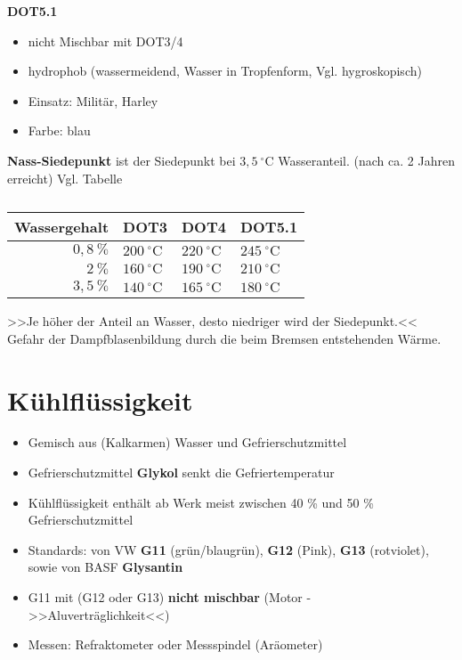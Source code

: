 \textbf{DOT5.1}

\begin{itemize}
\item
  nicht Mischbar mit DOT3/4
\item
  hydrophob (wassermeidend, Wasser in Tropfenform, Vgl. hygroskopisch)
\item
  Einsatz: Militär, Harley
\item
  Farbe: blau
\end{itemize}

\textbf{Nass-Siedepunkt} ist der Siedepunkt bei $3,5~^\circ\text{C}$
Wasseranteil. (nach ca. 2 Jahren erreicht) Vgl. Tabelle

\begin{table}[!ht]%
\centering 
	\caption{}%
\begin{tabular}{@{}rlll@{}}
\hline
\textbf{Wassergehalt} & \textbf{DOT3} & \textbf{DOT4} &
\textbf{DOT5.1} \\
\hline
$0,8~\%$ & $200~^\circ\text{C}$ & $220~^\circ\text{C}$ &
$245~^\circ\text{C}$ \\
$2~\%$ & $160~^\circ\text{C}$ & $190~^\circ\text{C}$ &
$210~^\circ\text{C}$ \\
$3,5~\%$ & $140~^\circ\text{C}$ & $165~^\circ\text{C}$ &
$180~^\circ\text{C}$ \\
\hline
\end{tabular} 
\end{table}

>>Je höher der Anteil an Wasser, desto niedriger wird der Siedepunkt.<<
Gefahr der Dampfblasenbildung durch die beim Bremsen entstehenden Wärme.

\section{Kühlflüssigkeit}\label{kuehlfluessigkeit}

\begin{itemize}
\item
  Gemisch aus (Kalkarmen) Wasser und Gefrierschutzmittel
\item
  Gefrierschutzmittel \textbf{Glykol} senkt die Gefriertemperatur
\item
  Kühlflüssigkeit enthält ab Werk meist zwischen 40 \% und 50 \%
  Gefrierschutzmittel
\item
  Standards: von VW \textbf{G11} (grün/blaugrün), \textbf{G12} (Pink),
  \textbf{G13} (rotviolet), sowie von BASF \textbf{Glysantin}
\item
  G11 mit (G12 oder G13) \textbf{nicht mischbar} (Motor -
  >>Aluverträglichkeit<<)
\item
  Messen: Refraktometer oder Messspindel (Aräometer)
\end{itemize}

